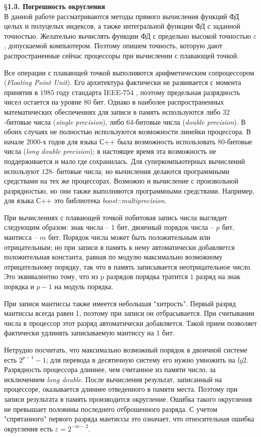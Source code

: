\S \textbf{1.3. Погрешность округления}
\\

В данной работе рассматриваются методы прямого вычисления функций
ФД целых и полуцелых индексов, а также интегральной функции ФД с
заданной точностью. Желательно вычислять функции ФД с предельно высокой
точностью $\varepsilon$, допускаемой компьютером. Поэтому опишем точность, которую
дают распространенные сейчас процессоры при вычислении с плавающей
точкой.

Все операции с плавающей точкой
выполняются арифметическим сопроцессором (\textit{Floating Point Unit}). Его
архитектура фактически не развивается с момента принятия в $1985$ году
стандарта IEEE-754 \cite{IEEE_754}, поэтому предельная разрядность чисел остается на
уровне $80$ бит. Однако в наиболее распространенных математических
обеспечениях для записи в память используются либо $32$-битовые числа (\textit{single
precision}), либо $64$-битовые числа (\textit{double precision}). В обоих случаях не
полностью используются возможности линейки процессора. В начале $2000$-х
годов для языка С++ была возможность использовать $80$-битовые числа (\textit{long
double precision}); в настоящее время эта возможность не поддерживается и мало
где сохранилась. Для суперкомпьютерных вычислений используют $128$-
битовые числа; но вычисления делаются программными средствами на тех же
процессорах. Возможно и вычисление с произвольной разрядностью, но они
также выполняются программными средствами. Например, для языка С++ это
библиотека \textit{boost::multiprecision}.

При вычислениях с плавающей точкой побитовая запись числа выглядит
следующим образом: знак числа – 1 бит, двоичный порядок числа – $p$ бит,
мантисса – $m$ бит. Порядок числа может быть положительным или
отрицательным; но при записи в память к нему автоматически добавляется
положительная константа, равная по модулю максимально возможному
отрицательному порядку, так что в память записывается неотрицательное
число. Это эквивалентно тому, что из p разрядов порядка тратится $1$ разряд на
знак порядка и $p-1$ на модуль порядка.

При записи мантиссы также имеется небольшая "хитрость". Первый
разряд мантиссы всегда равен 1, поэтому при записи он отбрасывается. При
считывании числа в процессор этот разряд автоматически добавляется. Такой
прием позволяет фактически удлинять записываемую мантиссу на 1 бит.

Нетрудно посчитать, что максимально возможный порядок в двоичной
системе есть $2^{p-1} - 1$; для перевода в десятичную систему его нужно умножить
на $lg2$. Разрядность процессора длиннее, чем считанное из памяти число, за
исключением \textit{long double}. После вычисления результат, записанный на
процессоре, оказывается длиннее отведенного в памяти места. Поэтому при
записи результата в память производится округление. Ошибка такого
округления не превышает половины последнего отброшенного разряда. С
учетом "спрятанного" первого разряда мантиссы это означает, что
относительная ошибка округления есть $\varepsilon = 2^{-m-2}$.

